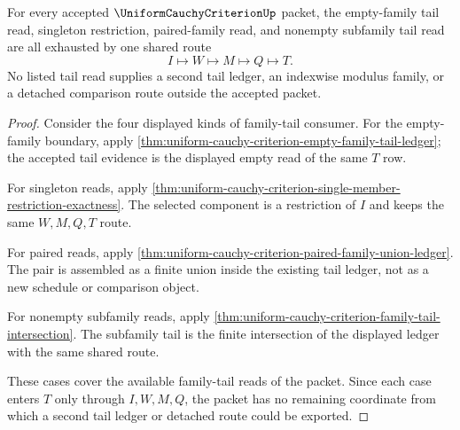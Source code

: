 \begin{theorem}
\label{thm:uniform-cauchy-criterion-shared-tail-ledger-coverage}
For every accepted $\UniformCauchyCriterionUp$ packet, the empty-family tail read, singleton restriction, paired-family read, and nonempty subfamily tail read are all exhausted by one shared route
$$
I \longmapsto W \longmapsto M \longmapsto Q \longmapsto T.
$$
No listed tail read supplies a second tail ledger, an indexwise modulus family, or a detached comparison route outside the accepted packet.
\end{theorem}
\begin{proof}
Consider the four displayed kinds of family-tail consumer. For the empty-family boundary, apply \autoref{thm:uniform-cauchy-criterion-empty-family-tail-ledger}; the accepted tail evidence is the displayed empty read of the same $T$ row.

For singleton reads, apply \autoref{thm:uniform-cauchy-criterion-single-member-restriction-exactness}. The selected component is a restriction of $I$ and keeps the same $W,M,Q,T$ route.

For paired reads, apply \autoref{thm:uniform-cauchy-criterion-paired-family-union-ledger}. The pair is assembled as a finite union inside the existing tail ledger, not as a new schedule or comparison object.

For nonempty subfamily reads, apply \autoref{thm:uniform-cauchy-criterion-family-tail-intersection}. The subfamily tail is the finite intersection of the displayed ledger with the same shared route.

These cases cover the available family-tail reads of the packet. Since each case enters $T$ only through $I,W,M,Q$, the packet has no remaining coordinate from which a second tail ledger or detached route could be exported.
\end{proof}

